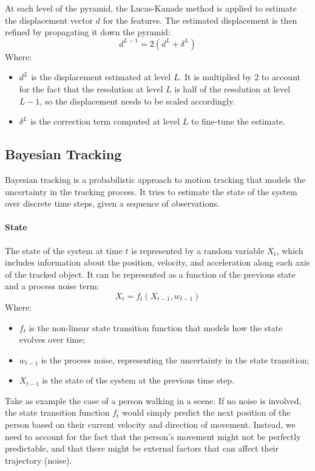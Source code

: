 At each level of the pyramid, the Lucas-Kanade method is applied to estimate the displacement vector $d$ for the features.
The estimated displacement is then refined by propagating it down the pyramid:
$$d^{L-1} = 2(d^L + \delta^{L})$$ 
Where:
\begin{itemize}
    \item $d^L$ is the displacement estimated at level $L$. It is multiplied by 2 to account for the fact that the resolution at level $L$ is half of the resolution at level $L-1$, 
    so the displacement needs to be scaled accordingly.
    \item $\delta^{L}$ is the correction term computed at level $L$ to fine-tune the estimate.
\end{itemize}

\subsection{Bayesian Tracking}
Bayesian tracking is a probabilistic approach to motion tracking that models the uncertainty in the tracking process. 
It tries to estimate the state of the system over discrete time steps, given a sequence of observations.

\paragraph{State}
\label{bayesian-tracking:state}
The state of the system at time $t$ is represented by a random variable $X_t$, which includes information about the position, velocity, 
and acceleration along each axis of the tracked object.
It can be represented as a function of the previous state and a process noise term:
$$X_t = f_t(X_{t-1}, w_{t-1})$$
Where:
\begin{itemize}
    \item $f_t$ is the non-linear state transition function that models how the state evolves over time;
    \item $w_{t-1}$ is the process noise, representing the uncertainty in the state transition;
    \item $X_{t-1}$ is the state of the system at the previous time step.
\end{itemize}
Take as example the case of a person walking in a scene. If no noise is involved, the state transition function $f_t$ would simply 
predict the next position of the person based on their current velocity and direction of movement. Instead, we need to account for the fact
that the person's movement might not be perfectly predictable, and that there might be external factors that can affect their trajectory (noise).


